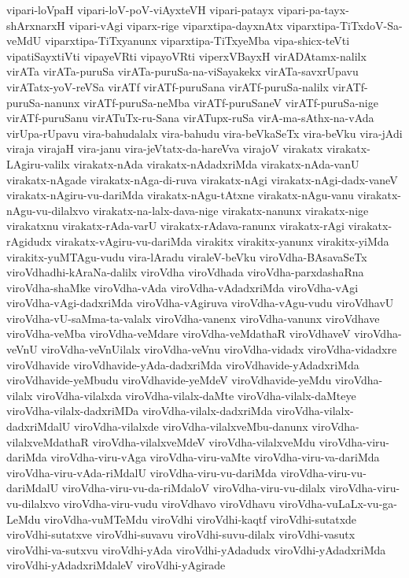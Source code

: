 {vipari-loVpaH
vipari-loV-poV-viAyxteVH
vipari-patayx
vipari-pa-tayx-shArxnarxH
vipari-vAgi
viparx-rige
viparxtipa-dayxnAtx
viparxtipa-TiTxdoV-Sa-veMdU
viparxtipa-TiTxyanunx
viparxtipa-TiTxyeMba
vipa-shicx-teVti
vipatiSayxtiVti
vipayeVRti
vipayoVRti
viperxVBayxH
virADAtamx-nalilx
virATa
virATa-puruSa
virATa-puruSa-na-viSayakekx
virATa-savxrUpavu
virATatx-yoV-reVSa
virATf
virATf-puruSana
virATf-puruSa-nalilx
virATf-puruSa-nanunx
virATf-puruSa-neMba
virATf-puruSaneV
virATf-puruSa-nige
virATf-puruSanu
virATuTx-ru-Sana
virATupx-ruSa
virA-ma-sAthx-na-vAda
virUpa-rUpavu
vira-bahudalalx
vira-bahudu
vira-beVkaSeTx
vira-beVku
vira-jAdi
viraja
virajaH
vira-janu
vira-jeVtatx-da-hareVva
virajoV
virakatx
virakatx-LAgiru-valilx
virakatx-nAda
virakatx-nAdadxriMda
virakatx-nAda-vanU
virakatx-nAgade
virakatx-nAga-di-ruva
virakatx-nAgi
virakatx-nAgi-dadx-vaneV
virakatx-nAgiru-vu-dariMda
virakatx-nAgu-tAtxne
virakatx-nAgu-vanu
virakatx-nAgu-vu-dilalxvo
virakatx-na-lalx-dava-nige
virakatx-nanunx
virakatx-nige
virakatxnu
virakatx-rAda-varU
virakatx-rAdava-ranunx
virakatx-rAgi
virakatx-rAgidudx
virakatx-vAgiru-vu-dariMda
virakitx
virakitx-yanunx
virakitx-yiMda
virakitx-yuMTAgu-vudu
vira-lAradu
viraleV-beVku
viroVdha-BAsavaSeTx
viroVdhadhi-kAraNa-dalilx
viroVdha
viroVdhada
viroVdha-parxdashaRna
viroVdha-shaMke
viroVdha-vAda
viroVdha-vAdadxriMda
viroVdha-vAgi
viroVdha-vAgi-dadxriMda
viroVdha-vAgiruva
viroVdha-vAgu-vudu
viroVdhavU
viroVdha-vU-saMma-ta-valalx
viroVdha-vanenx
viroVdha-vanunx
viroVdhave
viroVdha-veMba
viroVdha-veMdare
viroVdha-veMdathaR
viroVdhaveV
viroVdha-veVnU
viroVdha-veVnUilalx
viroVdha-veVnu
viroVdha-vidadx
viroVdha-vidadxre
viroVdhavide
viroVdhavide-yAda-dadxriMda
viroVdhavide-yAdadxriMda
viroVdhavide-yeMbudu
viroVdhavide-yeMdeV
viroVdhavide-yeMdu
viroVdha-vilalx
viroVdha-vilalxda
viroVdha-vilalx-daMte
viroVdha-vilalx-daMteye
viroVdha-vilalx-dadxriMDa
viroVdha-vilalx-dadxriMda
viroVdha-vilalx-dadxriMdalU
viroVdha-vilalxde
viroVdha-vilalxveMbu-danunx
viroVdha-vilalxveMdathaR
viroVdha-vilalxveMdeV
viroVdha-vilalxveMdu
viroVdha-viru-dariMda
viroVdha-viru-vAga
viroVdha-viru-vaMte
viroVdha-viru-va-dariMda
viroVdha-viru-vAda-riMdalU
viroVdha-viru-vu-dariMda
viroVdha-viru-vu-dariMdalU
viroVdha-viru-vu-da-riMdaloV
viroVdha-viru-vu-dilalx
viroVdha-viru-vu-dilalxvo
viroVdha-viru-vudu
viroVdhavo
viroVdhavu
viroVdha-vuLaLx-vu-ga-LeMdu
viroVdha-vuMTeMdu
viroVdhi
viroVdhi-kaqtf
viroVdhi-sutatxde
viroVdhi-sutatxve
viroVdhi-suvavu
viroVdhi-suvu-dilalx
viroVdhi-vasutx
viroVdhi-va-sutxvu
viroVdhi-yAda
viroVdhi-yAdadudx
viroVdhi-yAdadxriMda
viroVdhi-yAdadxriMdaleV
viroVdhi-yAgirade
}
